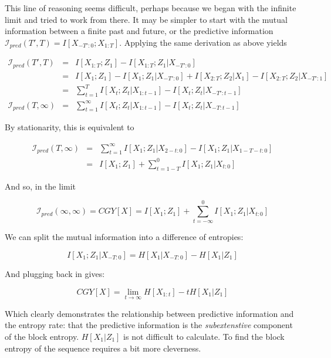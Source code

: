 \documentclass[11pt]{article}
\newcommand{\Ipred}{\mathcal{I}_{pred}}
\newcommand{\C}{CGY}
\begin{document}
This line of reasoning seems difficult, perhaps because we began with the infinite limit and tried to work from there.  It may be simpler to start with the mutual information between a finite past and future, or the predictive information $\Ipred(T',T) = I[X_{-T':0};X_{1:T}]$.  Applying the same derivation as above yields

\begin{eqnarray*}
\Ipred(T',T) & = & I[X_{1:T};Z_1] - I[X_{1:T};Z_1|X_{-T':0}] \\
& = & I[X_1;Z_1] - I[X_1;Z_1|X_{-T':0}] + I[X_{2:T};Z_2|X_1] - I[X_{2:T};Z_2|X_{-T':1}] \\
& = & \sum_{t=1}^T I[X_t;Z_t|X_{1:t-1}] - I[X_t;Z_t|X_{-T':t-1}] \\
\Ipred(T,\infty) & = & \sum_{t=1}^\infty I[X_t;Z_t|X_{1:t-1}] - I[X_t;Z_t|X_{-T:t-1}]
\end{eqnarray*}

By stationarity, this is equivalent to

\begin{eqnarray*}
\Ipred(T,\infty) & = & \sum_{t=1}^\infty I[X_1;Z_1|X_{2-t:0}] - I[X_1;Z_1|X_{1-T-t:0}] \\
& = & I[X_1;Z_1] + \sum_{t=1-T}^0 I[X_1;Z_1|X_{t:0}]
\end{eqnarray*}

And so, in the limit

\[
\Ipred(\infty,\infty) = \C[X] = I[X_1;Z_1] + \sum_{t = -\infty}^0 I[X_1;Z_1|X_{t:0}]
\]

We can split the mutual information into a difference of entropies:

\[
I[X_1;Z_1|X_{-T:0}] = H[X_1|X_{-T:0}] - H[X_1|Z_1]
\]

And plugging back in gives:

\[
\C[X] = \lim_{t\rightarrow\infty} H[X_{1:t}] - tH[X_1|Z_1]
\]

Which clearly demonstrates the relationship between predictive information and the entropy rate: that the predictive information is the {\em subextenstive} component of the block entropy.  $H[X_1|Z_1]$ is not difficult to calculate.  To find the block entropy of the sequence requires a bit more cleverness.
\end{document}

